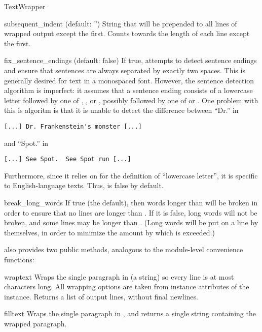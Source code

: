 \begin{classdesc}{TextWrapper}
\begin{memberdesc}[string]{subsequent_indent}
(default: '') String that will be prepended to all lines of wrapped
output except the first.  Counts towards the length of each line except
the first.
\end{memberdesc}

\begin{memberdesc}[bool]{fix_sentence_endings}
(default: false) If true,  attempts to detect
sentence endings and ensure that sentences are always separated by
exactly two spaces.  This is generally desired for text in a monospaced
font.  However, the sentence detection algorithm is imperfect: it
assumes that a sentence ending consists of a lowercase letter followed
by one of ,
\character{!}, or , possibly followed by one of
 or .  One problem with this is algoritm is
that it is unable to detect the difference between ``Dr.'' in
\begin{verbatim}
[...] Dr. Frankenstein's monster [...]
\end{verbatim}
and ``Spot.'' in
\begin{verbatim}
[...] See Spot.  See Spot run [...]
\end{verbatim}
Furthermore, since it relies on  for the
definition of ``lowercase letter'', it is specific to English-language
texts.  Thus,  is false by default.
\end{memberdesc}

\begin{memberdesc}[bool]{break_long_words}
If true (the default), then words longer than  will be broken
in order to ensure that no lines are longer than .  If it is
false, long words will not be broken, and some lines may be longer than
.  (Long words will be put on a line by themselves, in order
to minimize the amount by which  is exceeded.)
\end{memberdesc}

 also provides two public methods, analogous to the
module-level convenience functions:

\begin{methoddesc}{wrap}{text}
Wraps the single paragraph in  (a string) so every line is at
most  characters long.  All wrapping options are taken from
instance attributes of the  instance.  Returns a list
of output lines, without final newlines.
\end{methoddesc}

\begin{methoddesc}{fill}{text}
Wraps the single paragraph in , and returns a single string
containing the wrapped paragraph.
\end{methoddesc}

\end{classdesc}
